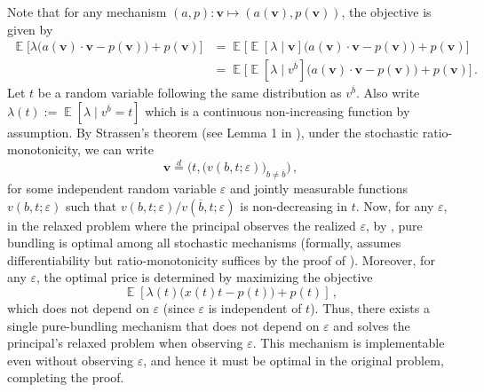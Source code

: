 \documentclass[12pt,letterpaper]{article}
\newenvironment{original}{\color{black}\noindent}{}
\theoremstyle{plain}
\theoremstyle{definition}
\theoremstyle{remark}
\DeclareMathOperator{\E}{\mathds{E}}
\renewcommand{\1}{\mathds{1}}
\newcommand\eqid{\stackrel{d}{=}}
\theoremstyle{definition}
\begin{document}
\begin{original}
Note that for any mechanism $(a, p): \mathbf{v} \mapsto (a(\mathbf{v}), p(\mathbf{v}))$, the objective is given by
\begin{align*}
 \E\Big[\lambda\big(a(\mathbf{v}) \cdot \mathbf{v} - p(\mathbf{v}) \big) + p(\mathbf{v}) \Big] &= \E\Big[\E[\lambda\mid \mathbf{v}]\big(a(\mathbf{v}) \cdot \mathbf{v} - p(\mathbf{v}) \big) + p(\mathbf{v}) \Big]   \\
 & = \E\Big[\E[\lambda \mid v^{\overline{b}}]\big(a(\mathbf{v}) \cdot \mathbf{v} - p(\mathbf{v}) \big) + p(\mathbf{v}) \Big] \,.
\end{align*}
Let $t$ be a random variable following the same distribution as $v^{\overline{b}}$. Also write $\lambda(t) := \E[\lambda \mid v^{\overline{b}} = t]$ which is a continuous non-increasing function by assumption. By Strassen's theorem (see Lemma 1 in \citealt{yang2022costly}), under the stochastic ratio-monotonicity, we can write
\[\mathbf{v} \eqid \Big(t, \big(v(b, t; \varepsilon)\big)_{b \neq \overline{b}}\Big)\,,\]
for some independent random variable $\varepsilon$ and jointly measurable functions $v(b, t; \varepsilon)$ such that $v(b, t; \varepsilon)/v(\overline{b}, t; \varepsilon)$ is non-decreasing in $t$. Now, for any $\varepsilon$, in the relaxed problem where the principal observes the realized $\varepsilon$, by , pure bundling is optimal among all stochastic mechanisms (formally,  assumes differentiability but ratio-monotonicity suffices by the proof of ). Moreover, for any $\varepsilon$, the optimal price is determined by maximizing the objective
\[\E[\lambda(t) \big(x(t) t - p(t)\big) + p(t)]\,,\]
which does not depend on $\varepsilon$ (since $\varepsilon$ is independent of $t$). Thus, there exists  a single pure-bundling mechanism that does not depend on $\varepsilon$ and solves the principal's relaxed problem when observing $\varepsilon$. This mechanism is implementable even without observing $\varepsilon$, and hence it must be optimal in the original problem, completing the proof.
\end{original}
\end{document}
